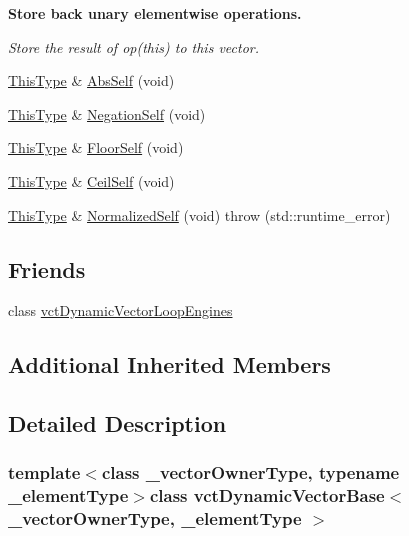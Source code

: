 \begin{Indent}{\bf Store back unary elementwise operations.}\par
{\em Store the result of op(this) to this vector. }\begin{DoxyCompactItemize}
\item 
\hyperlink{classvct_dynamic_const_vector_base_a39da273523717f678f54d3321ebca3dd}{This\+Type} \& \hyperlink{classvct_dynamic_vector_base_ab3c44e0d5224cf4f2dec1d506ab6c604}{Abs\+Self} (void)
\item 
\hyperlink{classvct_dynamic_const_vector_base_a39da273523717f678f54d3321ebca3dd}{This\+Type} \& \hyperlink{classvct_dynamic_vector_base_a569459da915ad59245304445ae699782}{Negation\+Self} (void)
\item 
\hyperlink{classvct_dynamic_const_vector_base_a39da273523717f678f54d3321ebca3dd}{This\+Type} \& \hyperlink{classvct_dynamic_vector_base_ab900e7960dbd3dbf857673ed27f29cb2}{Floor\+Self} (void)
\item 
\hyperlink{classvct_dynamic_const_vector_base_a39da273523717f678f54d3321ebca3dd}{This\+Type} \& \hyperlink{classvct_dynamic_vector_base_a8ffae784a033f6595e133d4c4abe6b39}{Ceil\+Self} (void)
\item 
\hyperlink{classvct_dynamic_const_vector_base_a39da273523717f678f54d3321ebca3dd}{This\+Type} \& \hyperlink{classvct_dynamic_vector_base_a9e20a5576c634ae993c7eca4c35aab98}{Normalized\+Self} (void)  throw (std\+::runtime\+\_\+error)
\end{DoxyCompactItemize}
\end{Indent}
\subsection*{Friends}
\begin{DoxyCompactItemize}
\item 
class \hyperlink{classvct_dynamic_vector_base_af017ae93f1ac2b0bb0431a0aedb79ca1}{vct\+Dynamic\+Vector\+Loop\+Engines}
\end{DoxyCompactItemize}
\subsection*{Additional Inherited Members}


\subsection{Detailed Description}
\subsubsection*{template$<$class \+\_\+vector\+Owner\+Type, typename \+\_\+element\+Type$>$class vct\+Dynamic\+Vector\+Base$<$ \+\_\+vector\+Owner\+Type, \+\_\+element\+Type $>$}

